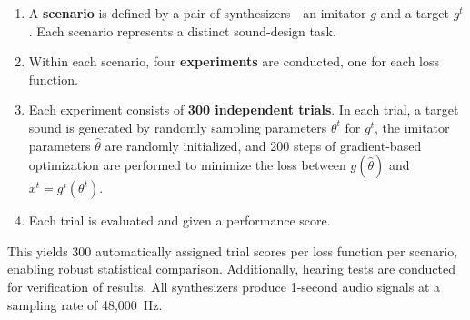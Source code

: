 \documentclass[10pt]{article} %
\begin{document}
\begin{enumerate}
    \item A \textbf{scenario} is defined by a pair of synthesizers---an imitator $g$ and a target $g^t$. Each scenario represents a distinct sound-design task.
    \item Within each scenario, four \textbf{experiments} are conducted, one for each loss function.
    \item Each experiment consists of \textbf{300 independent trials}. In each trial, a target sound is generated by randomly sampling parameters $\theta^t$ for $g^t$, the imitator parameters $\hat{\theta}$ are randomly initialized, and 200 steps of gradient-based optimization are performed to minimize the loss between $g(\hat{\theta})$ and $x^t = g^t(\theta^t)$.
    \item Each trial is evaluated and given a performance score.
\end{enumerate}

This yields 300 automatically assigned trial scores per loss function per scenario, enabling robust statistical comparison. Additionally, hearing tests are conducted for verification of results. All synthesizers produce 1-second audio signals at a sampling rate of 48{,}000~Hz.



\end{document}
